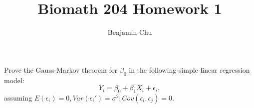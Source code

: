\documentclass[12pt]{article}
\newenvironment{problem}[2][Problem]{\begin{trivlist}
\item[\hskip \labelsep {\bfseries #1}\hskip \labelsep {\bfseries #2.}]}{\end{trivlist}}
\begin{document}
 
 
\title{Biomath 204 Homework 1}
\author{Benjamin Chu}
\maketitle
 
\begin{problem}{1}
Prove the Gauss-Markov theorem for $\beta_0$ in the following simple linear regression model:
$$Y_i = \beta_0 + \beta_1X_i + \epsilon_i,$$
assuming $E(\epsilon_i) = 0, Var(\epsilon_i') = \sigma^2, Cov(\epsilon_i, \epsilon_j) = 0.$
\end{problem}
\end{document}
